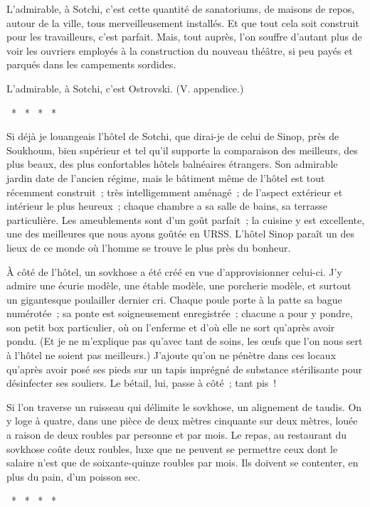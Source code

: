 \documentclass[french,twoside]{book} %
\begin{document}
L’admirable, à Sotchi, c’est cette quantité de sanatoriums, de maisons de repos, autour de la ville, tous merveilleusement installés. Et que tout cela soit construit pour les travailleurs, c’est parfait. Mais, tout auprès, l’on souffre d’autant plus de voir les ouvriers employés à la construction du nouveau théâtre, si peu payés et parqués dans les campements sordides.\par
L’admirable, à Sotchi, c’est Ostrovski. (V. appendice.)\par
{\centering \noindent *  *  *  *  *\par}
\noindent Si déjà je louangeais l’hôtel de Sotchi, que dirai-je de celui de Sinop, près de Soukhoum, bien supérieur et tel qu’il supporte la comparaison des meilleurs, des plus beaux, des plus confortables hôtels balnéaires étrangers. Son admirable jardin date de l’ancien régime, mais le bâtiment même de l’hôtel est tout récemment construit ; très intelligemment aménagé ; de l’aspect extérieur et intérieur le plus heureux ; chaque chambre a sa salle de bains, sa terrasse particulière. Les ameublements sont d’un goût parfait ; la cuisine y est excellente, une des meilleures que nous ayons goûtée en URSS. L’hôtel Sinop paraît un des lieux de ce monde où l’homme se trouve le plus près du bonheur.\par
À côté de l’hôtel, un sovkhose a été créé en vue d’approvisionner celui-ci. J’y admire une écurie modèle, une étable modèle, une porcherie modèle, et surtout un gigantesque poulailler dernier cri. Chaque poule porte à la patte sa bague numérotée ; sa ponte est soigneusement enregistrée ; chacune a pour y pondre, son petit box particulier, où on l’enferme et d’où elle ne sort qu’après avoir pondu. (Et je ne m’explique pas qu’avec tant de soins, les œufs que l’on nous sert à l’hôtel ne soient pas meilleurs.) J’ajoute qu’on ne pénètre dans ces locaux qu’après avoir posé ses pieds sur un tapis imprégné de substance stérilisante pour désinfecter ses souliers. Le bétail, lui, passe à côté ; tant pis !\par
Si l’on traverse un ruisseau qui délimite le sovkhose, un alignement de taudis. On y loge à quatre, dans une pièce de deux mètres cinquante sur deux mètres, louée a raison de deux roubles par personne et par mois. Le repas, au restaurant du sovkhose coûte deux roubles, luxe que ne peuvent se permettre ceux dont le salaire n’est que de soixante-quinze roubles par mois. Ils doivent se contenter, en plus du pain, d’un poisson sec.\par
{\centering \noindent *  *  *  *  *\par}
\end{document}
